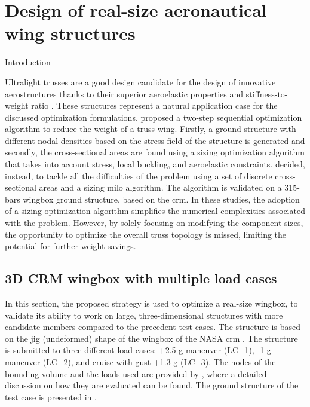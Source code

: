 \setchapterpreamble[u]{\margintoc}
\glsresetall %

\chapter{Design of real-size aeronautical wing structures} \label{chap:07}
Introduction

Ultralight trusses are a good design candidate for the design of innovative aerostructures thanks to their superior aeroelastic properties and stiffness-to-weight ratio . These structures represent a natural application case for the discussed optimization formulations.  proposed a two-step sequential optimization algorithm to reduce the weight of a truss wing. Firstly, a ground structure with different nodal densities based on the stress field of the structure is generated and secondly, the cross-sectional areas are found using a sizing optimization algorithm that takes into account stress, local buckling, and aeroelastic constraints.  decided, instead, to tackle all the difficulties of the problem using a set of discrete cross-sectional areas and a sizing \gls{milo} algorithm. The algorithm is validated on a 315-bars wingbox ground structure, based on the \gls{crm}. In these studies, the adoption of a sizing optimization algorithm simplifies the numerical complexities associated with the problem. However, by solely focusing on modifying the component sizes, the opportunity to optimize the overall truss topology is missed, limiting the potential for further weight savings.

\section{3D CRM wingbox with multiple load cases}
In this section, the proposed strategy is used to optimize a real-size wingbox, to validate its ability to work on large, three-dimensional structures with more candidate members compared to the precedent test cases. The structure is based on the jig (undeformed) shape of the wingbox of the NASA \gls{crm} . The structure is submitted to three different load cases: +2.5 g maneuver (LC\_1), -1 g maneuver (LC\_2), and cruise with gust +1.3 g (LC\_3). The nodes of the bounding volume and the loads used are provided by , where a detailed discussion on how they are evaluated can be found. The ground structure of the test case is presented in .

